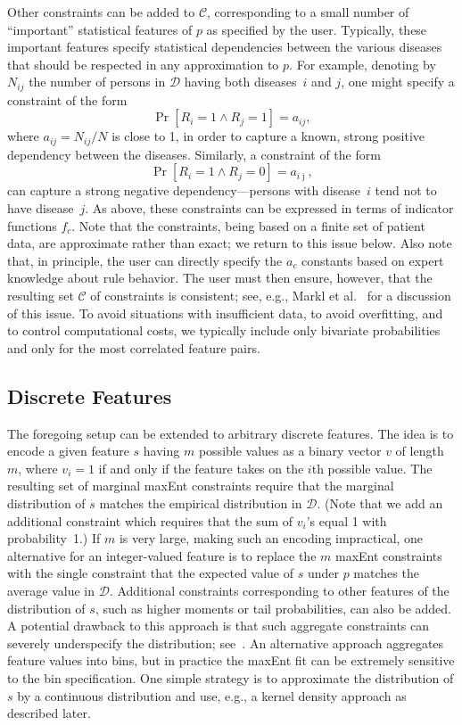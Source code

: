 \documentclass[11pt]{article}
\DeclareMathOperator{\prb}{Pr}
\newcommand{\prob}[1]{\prb[#1]}
\newcommand{\xC}{\mathcal{C}}
\newcommand{\xD}{\mathcal{D}}
\begin{document}
Other constraints can be added to $\xC$, corresponding to a small number of ``important'' statistical features of $p$ as specified by the user. Typically, these important features specify statistical dependencies between the various diseases that should be respected in any approximation to $p$. For example, denoting by $N_{ij}$ the number of persons in $\xD$ having both diseases~$i$ and $j$, one might specify a constraint of the form
\[
\prob{R_i=1\wedge R_j=1}=a_{ij},
\]
where $a_{ij}=N_{ij}/N$ is close to 1, in order to capture a known, strong positive dependency between the diseases. Similarly, a constraint of the form
\[
\prob{R_i=1\wedge R_j=0}=a_{i\bar{\jmath}},
\]
can capture a strong negative dependency---persons with disease~$i$ tend not to have disease~$j$. As above, these constraints can be expressed in terms of indicator functions $f_c$. Note that the constraints, being based on a finite set of patient data, are approximate rather than exact; we return to this issue below. Also note that, in principle, the user can directly specify the $a_c$ constants based on expert knowledge about rule behavior. The user must then ensure, however, that the resulting set $\xC$ of constraints is consistent; see, e.g., Markl et al.~\cite{Markl2007} for a discussion of this issue. To avoid situations with insufficient data, to avoid overfitting, and to control computational costs, we typically include only bivariate probabilities and only for the most correlated feature pairs.

\subsection{Discrete Features}

The foregoing setup can be extended to arbitrary discrete features. The idea is to encode a given feature $s$ having $m$ possible values as a binary vector $v$ of length~$m$, where $v_i=1$ if and only if the feature takes on the $i$th possible value. The resulting set of marginal maxEnt constraints require that the marginal distribution of $s$ matches the empirical distribution in $\xD$. (Note that we add an additional constraint which requires that the sum of $v_i$'s equal 1 with probability~1.) If $m$ is very large, making such an encoding impractical, one alternative for an integer-valued feature is to replace the $m$ maxEnt constraints with the single constraint that the expected value of $s$ under $p$ matches the average value in $\xD$. Additional constraints corresponding to other features of the distribution of $s$, such as higher moments or tail probabilities, can also be added. A potential drawback to this approach is that such aggregate constraints can severely underspecify the distribution; see~\cite{YuDA09}. An alternative approach aggregates feature values into bins, but in practice the maxEnt fit can be extremely sensitive to the bin specification. One simple strategy is to approximate the distribution of $s$ by a continuous distribution and use, e.g., a kernel density approach as described later.
\end{document}
